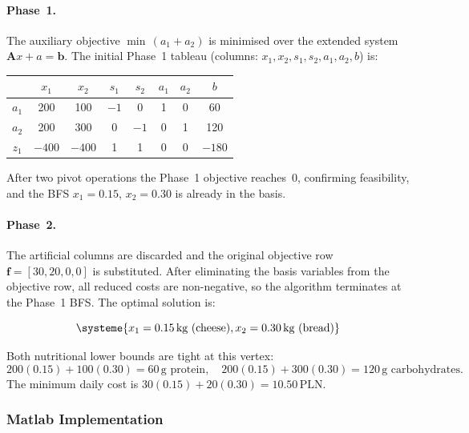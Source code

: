 \paragraph{Phase~1.}
The auxiliary objective $\min\,(a_1 + a_2)$ is minimised over the extended system
$\mathbf{A}x + a = \mathbf{b}$.
The initial Phase~1 tableau (columns: $x_1,x_2,s_1,s_2,a_1,a_2,b$) is:

\begin{table}[H]
    \centering
    \begin{tabular}{c|cc cc cc|c}
         & $x_1$ & $x_2$ & $s_1$ & $s_2$ & $a_1$ & $a_2$ & $b$ \\
        \hline
        $a_1$ & 200 & 100 & $-1$ & 0 & 1 & 0 & 60 \\
        $a_2$ & 200 & 300 & 0 & $-1$ & 0 & 1 & 120 \\
        \hline
        $z_1$ & $-400$ & $-400$ & 1 & 1 & 0 & 0 & $-180$ \\
    \end{tabular}
\end{table}

After two pivot operations the Phase~1 objective reaches~0, confirming feasibility, and
the BFS $x_1 = 0.15$, $x_2 = 0.30$ is already in the basis.

\paragraph{Phase~2.}
The artificial columns are discarded and the original objective row
$\mathbf{f} = [30, 20, 0, 0]$ is substituted.
After eliminating the basis variables from the objective row, all reduced costs are
non-negative, so the algorithm terminates at the Phase~1 BFS.
The optimal solution is:

\begin{equation*}
    \systeme{x_1 = 0.15\,\text{kg (cheese)},x_2 = 0.30\,\text{kg (bread)}}
\end{equation*}

Both nutritional lower bounds are tight at this vertex:
\begin{equation*}
    200(0.15) + 100(0.30) = 60\,\text{g protein},\quad
    200(0.15) + 300(0.30) = 120\,\text{g carbohydrates.}
\end{equation*}
The minimum daily cost is $30(0.15) + 20(0.30) = \mathbf{10.50}\,\text{PLN}$.

\subsubsection*{Matlab Implementation}
\label{problem:2:impl}

